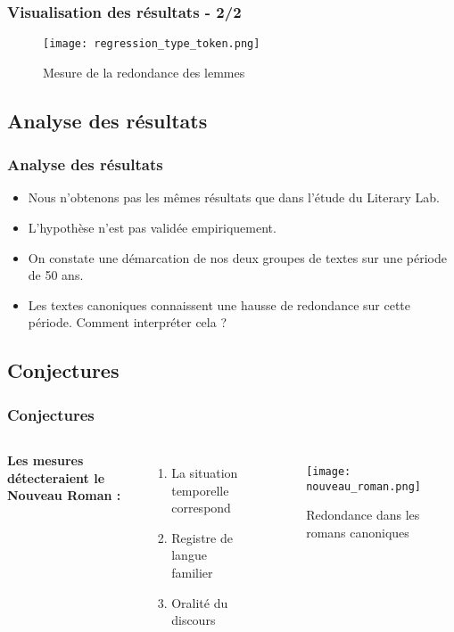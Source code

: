 \documentclass{beamer}
\begin{document}

\begin{frame}
\frametitle{Visualisation des résultats - 2/2}
\begin{figure}
    \centering
    \texttt{[image: regression\_type\_token.png]}
    \caption{Mesure de la redondance des lemmes}
    \label{type_token}
\end{figure}
\end{frame}


\subsection{Analyse des résultats}

\begin{frame}
\frametitle{Analyse des résultats}
\begin{itemize}
    \item Nous n'obtenons pas les mêmes résultats que dans l'étude du Literary Lab. 
    \item L'hypothèse n'est pas validée empiriquement.
    \item On constate une démarcation de nos deux groupes de textes sur une période de 50 ans.
    \item Les textes canoniques connaissent une hausse de redondance sur cette période. Comment interpréter cela ?
\end{itemize}

\end{frame}

\subsection{Conjectures}

\begin{frame}
\frametitle{Conjectures}
\begin{columns}[c]

\textbf{Les mesures détecteraient le Nouveau Roman :}
\begin{enumerate}
\item La situation temporelle correspond
\item Registre de langue familier
\item Oralité du discours
\end{enumerate}

\begin{figure}
    \centering
    \texttt{[image: nouveau\_roman.png]}
    \caption{Redondance dans les romans canoniques}
    \label{new_roman}
\end{figure}

\end{columns}
\end{frame}
\end{document}
